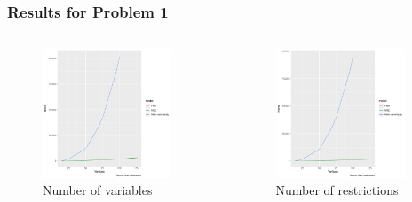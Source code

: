 \documentclass[aspectratio=169]{beamer}
\begin{document}
{\begin{frame}
\frametitle{Results for Problem 1}
\begin{columns}
\begin{figure}[ht]
\centering
\includegraphics[width=0.9\textwidth]{images/figure:3.pdf}
\caption{Number of variables}
\end{figure}
 

\begin{figure}[ht]
\centering
\includegraphics[width=0.9\textwidth]{images/figure:4.pdf}
\caption{Number of restrictions}
\end{figure}
\end{columns}
\end{frame}

}
\end{document}
